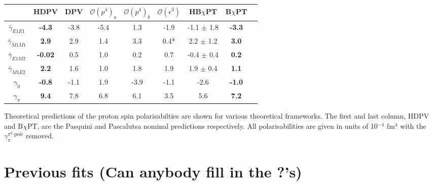 \documentclass[]{article}
\begin{document}
\begin{table}[h!]
	\centering %
	\begin{tabular}{|c|c|c|c|c|c|c|c|c|} %
		\hline %
		& \textbf{HDPV} & DPV &$\mathcal{O}(p^{4})_a$ & $\mathcal{O}(p^{4})_b$  & $\mathcal{O}(\epsilon^{3})$ & HB$\chi$PT & \textbf{B$\chi$PT} \\ [0.5ex] %
		\hline\hline %
		$\bar{\gamma}_{E1E1}$ & \textbf{-4.3}  & -3.8 & -5.4 & 1.3 & -1.9 & -1.1 $\pm$ 1.8 & \textbf{-3.3} \\ 
		$\bar{\gamma}_{M1M1}$ & \textbf{2.9}   & 2.9  & 1.4  & 3.3 & 0.4* & 2.2 $\pm$ 1.2 &\textbf{3.0} \\
		$\bar{\gamma}_{E1M2}$ & \textbf{-0.02} & 0.5  & 1.0  & 0.2 & 0.7 & -0.4 $\pm$ 0.4 & \textbf{0.2} \\
		$\bar{\gamma}_{M1E2}$ &\textbf{ 2.2 }  & 1.6  & 1.0  & 1.8 & 1.9 & 1.9 $\pm$ 0.4 & \textbf{1.1} \\
		\hline
		$\gamma_{0}$ 		  & \textbf{-0.8} &  -1.1 & 1.9  & -3.9 & -1.1  & -2.6 & \textbf{-1.0} \\
		$\gamma_{\pi}$ 		  &\textbf{9.4}  &   7.8 & 6.8  & 6.1  & 3.5  & 5.6 & \textbf{7.2} \\
		\hline %
	\end{tabular}
\end{table}

\noindent Theoretical predictions of the proton spin polarisabilties are shown for various theoretical frameworks. The first and last column, HDPV and B$\chi$PT, are the Pasquini and Pascalutsa nominal predictions respectively. All polarisabilities are given in units of 10$^{-4}$ fm$^{4}$ with the $\gamma_{\pi}^{\pi^{0}\text{-pole}}$ removed.

\section{Previous fits (Can anybody fill in the ?'s)}
\end{document}
